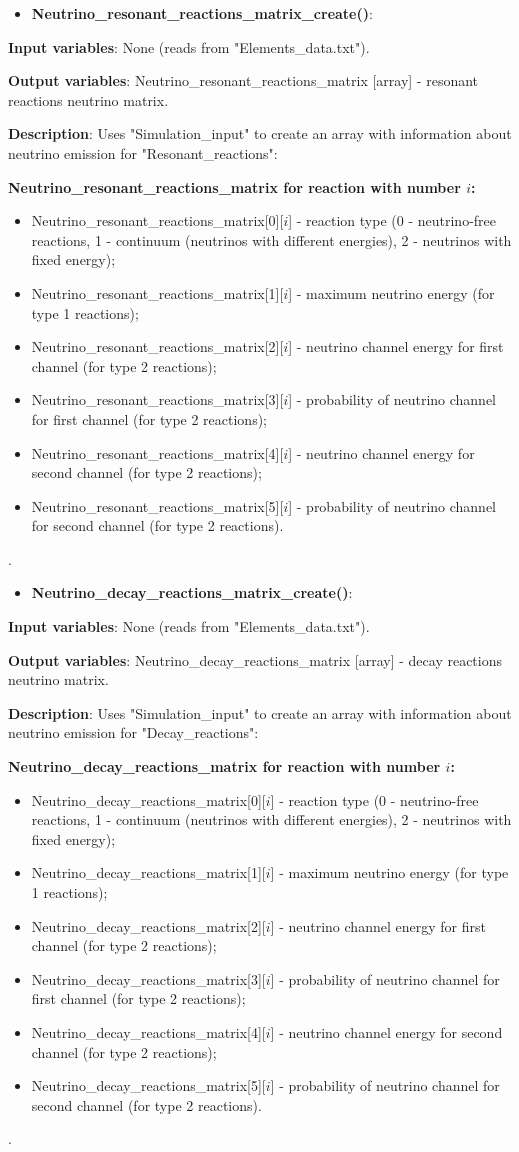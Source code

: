 \documentclass[a4paper,12pt]{article}
\newcommand{\namefunction}[4]{
  \begin{itemize}
    \item \textbf{#1}:
  \end{itemize}
  
  \textbf{Input variables}: #2.
  
  \textbf{Output variables}: #4.
  
  \textbf{Description}: #3.
}
\begin{document}
\namefunction{Neutrino\_resonant\_reactions\_matrix\_create()}{None (reads from "Elements\_data.txt")}{Uses "Simulation\_input" to create an array with information about neutrino emission for "Resonant\_reactions":

\textbf{Neutrino\_resonant\_reactions\_matrix for reaction with number $i$:}
\begin{itemize}
    \item Neutrino\_resonant\_reactions\_matrix[0][$i$] - reaction type (0 - neutrino-free reactions, 1 - continuum (neutrinos with different energies), 2 - neutrinos with fixed energy);
    \item Neutrino\_resonant\_reactions\_matrix[1][$i$] - maximum neutrino energy (for type 1 reactions);
    \item Neutrino\_resonant\_reactions\_matrix[2][$i$] - neutrino channel energy for first channel (for type 2 reactions);
    \item Neutrino\_resonant\_reactions\_matrix[3][$i$] - probability of neutrino channel for first channel (for type 2 reactions);
    \item Neutrino\_resonant\_reactions\_matrix[4][$i$] - neutrino channel energy for second channel (for type 2 reactions);
    \item Neutrino\_resonant\_reactions\_matrix[5][$i$] - probability of neutrino channel for second channel (for type 2 reactions).
\end{itemize}

}{Neutrino\_resonant\_reactions\_matrix [array] - resonant reactions neutrino matrix}

\vspace{1em}

\namefunction{Neutrino\_decay\_reactions\_matrix\_create()}{None (reads from "Elements\_data.txt")}{Uses "Simulation\_input" to create an array with information about neutrino emission for "Decay\_reactions":

\textbf{Neutrino\_decay\_reactions\_matrix for reaction with number $i$:}
\begin{itemize}
    \item Neutrino\_decay\_reactions\_matrix[0][$i$] - reaction type (0 - neutrino-free reactions, 1 - continuum (neutrinos with different energies), 2 - neutrinos with fixed energy);
    \item Neutrino\_decay\_reactions\_matrix[1][$i$] - maximum neutrino energy (for type 1 reactions);
    \item Neutrino\_decay\_reactions\_matrix[2][$i$] - neutrino channel energy for first channel (for type 2 reactions);
    \item Neutrino\_decay\_reactions\_matrix[3][$i$] - probability of neutrino channel for first channel (for type 2 reactions);
    \item Neutrino\_decay\_reactions\_matrix[4][$i$] - neutrino channel energy for second channel (for type 2 reactions);
    \item Neutrino\_decay\_reactions\_matrix[5][$i$] - probability of neutrino channel for second channel (for type 2 reactions).
\end{itemize}

}{Neutrino\_decay\_reactions\_matrix [array] - decay reactions neutrino matrix}
\end{document}
